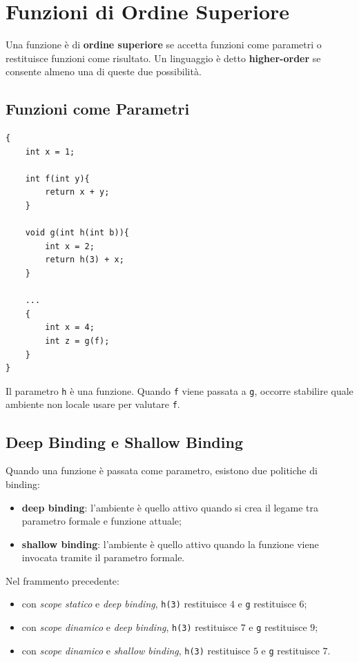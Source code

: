 \documentclass{article}
\begin{document}
\section{Funzioni di Ordine Superiore}

Una funzione è di \textbf{ordine superiore} se accetta funzioni come parametri o restituisce funzioni come risultato. Un linguaggio è detto \textbf{higher-order} se consente almeno una di queste due possibilità.

\subsection{Funzioni come Parametri}

\begin{lstlisting}
{
    int x = 1;

    int f(int y){
        return x + y;
    }

    void g(int h(int b)){
        int x = 2;
        return h(3) + x;
    }

    ...
    {
        int x = 4;
        int z = g(f);
    }
}
\end{lstlisting}

Il parametro \texttt{h} è una funzione. Quando \texttt{f} viene passata a \texttt{g}, occorre stabilire quale ambiente non locale usare per valutare \texttt{f}.

\subsection{Deep Binding e Shallow Binding}

Quando una funzione è passata come parametro, esistono due politiche di binding:
\begin{itemize}
  \item \textbf{deep binding}: l'ambiente è quello attivo quando si crea il legame tra parametro formale e funzione attuale;
  \item \textbf{shallow binding}: l'ambiente è quello attivo quando la funzione viene invocata tramite il parametro formale.
\end{itemize}

Nel frammento precedente:
\begin{itemize}
  \item con \textit{scope statico} e \textit{deep binding}, \texttt{h(3)} restituisce $4$ e \texttt{g} restituisce $6$;
  \item con \textit{scope dinamico} e \textit{deep binding}, \texttt{h(3)} restituisce $7$ e \texttt{g} restituisce $9$;
  \item con \textit{scope dinamico} e \textit{shallow binding}, \texttt{h(3)} restituisce $5$ e \texttt{g} restituisce $7$.
\end{itemize}
\end{document}
